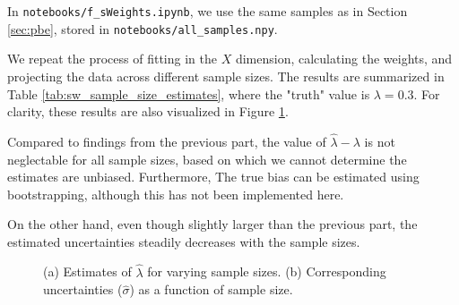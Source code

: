 \documentclass{article}
\begin{document}
In \texttt{notebooks/f\_sWeights.ipynb}, we use the same samples as in Section \ref{sec:pbe}, stored in \texttt{notebooks/all\_samples.npy}.

We repeat the process of fitting in the $X$ dimension, calculating the weights, and projecting the data across different sample sizes. The results are summarized in Table \ref{tab:sw_sample_size_estimates}, where the "truth" value is $\lambda = 0.3$. For clarity, these results are also visualized in Figure \ref{fig:sw_sample_sizes}.

Compared to findings from the previous part, the value of $\hat{\lambda} - 
\lambda$ is not neglectable for all sample sizes, based on which we cannot determine the estimates are unbiased. Furthermore, The true bias can be estimated using bootstrapping, although this has not been implemented here.

On the other hand, even though slightly larger than the previous part, the estimated uncertainties steadily decreases with the sample sizes.


\begin{figure}[t]
    \centering
    \hspace{0.0\textwidth}
    \caption{(a) Estimates of $\hat{\lambda}$ for varying sample sizes.
(b) Corresponding uncertainties ($\hat{\sigma}$) as a function of sample size.}
    \label{fig:sw_sample_sizes}
\end{figure}
\end{document}

